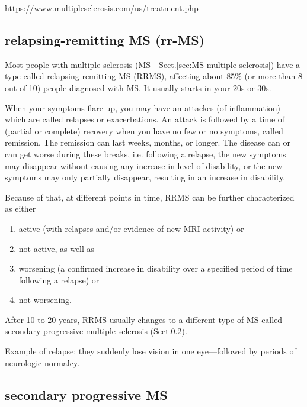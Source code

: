 \url{https://www.multiplesclerosis.com/us/treatment.php}

\subsection{relapsing-remitting MS (rr-MS)}
\label{sec:rrMS}
\label{sec:ALS-relapsing-remitting-MS}

Most people with multiple sclerosis (MS - Sect.\ref{sec:MS-multiple-sclerosis})
have a type called relapsing-remitting MS (RRMS), affecting about 85\% (or more
than 8 out of 10) people diagnosed with MS. It usually starts in your 20s or
30s.

When your symptoms flare up, you may have an attackes (of inflammation) - which
are called relapses or exacerbations.
An attack is followed by a time of (partial or complete) recovery when you have
no few or no symptoms, called remission. The remission can last weeks, months,
or longer. The disease can or can get worse during these breaks, i.e. following
a relapse, the new symptoms may disappear without causing any increase in level
of disability, or the new symptoms may only partially disappear, resulting in an
increase in disability.

Because of that, at different points in time, RRMS can be further characterized as either
\begin{enumerate}
  \item active (with relapses and/or evidence of new MRI activity) or 
  
  \item not active, as well as
  
  \item worsening (a confirmed increase in disability over a specified period of
  time following a relapse) or 
  
  \item not worsening.

\end{enumerate} 

After 10 to 20 years, RRMS usually changes to a different type of MS called
secondary progressive multiple sclerosis (Sect.\ref{sec:sp-MS}).

Example of relapse: they suddenly lose vision in one eye—followed by periods of neurologic normalcy. 

\subsection{secondary progressive MS}
\label{sec:sp-MS}
\label{sec:secondary-progressive-MS}


